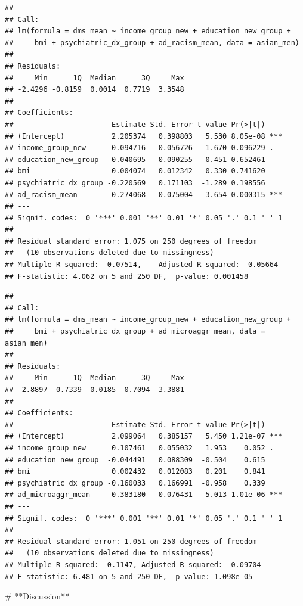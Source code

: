 \documentclass[
  12pt,
]{article}
\begin{document}
\begin{verbatim}
## 
## Call:
## lm(formula = dms_mean ~ income_group_new + education_new_group + 
##     bmi + psychiatric_dx_group + ad_racism_mean, data = asian_men)
## 
## Residuals:
##     Min      1Q  Median      3Q     Max 
## -2.4296 -0.8159  0.0014  0.7719  3.3548 
## 
## Coefficients:
##                       Estimate Std. Error t value Pr(>|t|)    
## (Intercept)           2.205374   0.398803   5.530 8.05e-08 ***
## income_group_new      0.094716   0.056726   1.670 0.096229 .  
## education_new_group  -0.040695   0.090255  -0.451 0.652461    
## bmi                   0.004074   0.012342   0.330 0.741620    
## psychiatric_dx_group -0.220569   0.171103  -1.289 0.198556    
## ad_racism_mean        0.274068   0.075004   3.654 0.000315 ***
## ---
## Signif. codes:  0 '***' 0.001 '**' 0.01 '*' 0.05 '.' 0.1 ' ' 1
## 
## Residual standard error: 1.075 on 250 degrees of freedom
##   (10 observations deleted due to missingness)
## Multiple R-squared:  0.07514,    Adjusted R-squared:  0.05664 
## F-statistic: 4.062 on 5 and 250 DF,  p-value: 0.001458
\end{verbatim}

\begin{verbatim}
## 
## Call:
## lm(formula = dms_mean ~ income_group_new + education_new_group + 
##     bmi + psychiatric_dx_group + ad_microaggr_mean, data = asian_men)
## 
## Residuals:
##     Min      1Q  Median      3Q     Max 
## -2.8897 -0.7339  0.0185  0.7094  3.3881 
## 
## Coefficients:
##                       Estimate Std. Error t value Pr(>|t|)    
## (Intercept)           2.099064   0.385157   5.450 1.21e-07 ***
## income_group_new      0.107461   0.055032   1.953    0.052 .  
## education_new_group  -0.044491   0.088309  -0.504    0.615    
## bmi                   0.002432   0.012083   0.201    0.841    
## psychiatric_dx_group -0.160033   0.166991  -0.958    0.339    
## ad_microaggr_mean     0.383180   0.076431   5.013 1.01e-06 ***
## ---
## Signif. codes:  0 '***' 0.001 '**' 0.01 '*' 0.05 '.' 0.1 ' ' 1
## 
## Residual standard error: 1.051 on 250 degrees of freedom
##   (10 observations deleted due to missingness)
## Multiple R-squared:  0.1147, Adjusted R-squared:  0.09704 
## F-statistic: 6.481 on 5 and 250 DF,  p-value: 1.098e-05
\end{verbatim}

\begin{centering}
# **Discussion**
\end{centering}
\end{document}
